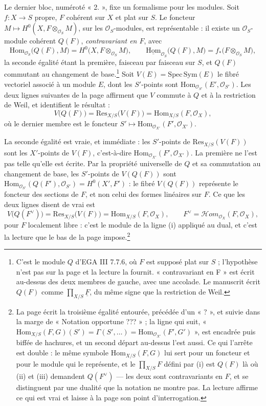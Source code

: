 \documentclass[11pt,a4paper]{article}
\begin{document}
Le dernier bloc, numéroté « 2. », fixe un formalisme pour les modules. Soit
$f : X \to S$ propre, $F$ cohérent sur $X$ et plat sur $S$. Le foncteur $M
\mapsto H^{0}(X, F \otimes_{\mathcal{O}_S} M)$, sur les $\mathcal{O}_S$-modules,
est représentable : il existe un $\mathcal{O}_S$-module cohérent $Q(F)$,
\emph{contravariant en $F$}, avec
\[
  \mathrm{Hom}_{\mathcal{O}_S}\bigl(Q(F), M\bigr) = H^{0}\bigl(X, F \otimes_{\mathcal{O}_S} M\bigr) ,
  \qquad
  \underline{\mathrm{Hom}}_{\mathcal{O}_S}\bigl(Q(F), M\bigr) = f_{*}\bigl(F \otimes_{\mathcal{O}_S} M\bigr) ,
\]
la seconde égalité étant la première, faisceau par faisceau sur $S$, et
$Q(F)$ commutant au changement de base.\footnote{C'est le module $Q$ d'EGA
III 7.7.6, où $F$ est supposé plat sur $S$ ; l'hypothèse n'est pas sur la page
et la lecture la fournit. « contravariant en F » est écrit au-dessus des deux
membres de gauche, avec une accolade. Le manuscrit écrit $Q(F)$ comme
$\prod_{X/S} \underline{F}$, du même signe que la restriction de Weil.} Soit
$V(E) = \mathrm{Spec}\,\mathrm{Sym}(E)$ le fibré vectoriel associé à un
module $E$, dont les $S'$-points sont $\mathrm{Hom}_{\mathcal{O}_{S'}}(E', \mathcal{O}_{S'})$.
Les deux lignes suivantes de la page affirment que $V$ commute à $Q$ et à la
restriction de Weil, et identifient le résultat :
\[
  V\bigl(Q(F)\bigr) = \mathrm{Res}_{X/S}\bigl(V(F)\bigr) = \mathrm{Hom}_{X/S}(F, \mathcal{O}_X) ,
\]
où le dernier membre est le foncteur $S' \mapsto \mathrm{Hom}_{\mathcal{O}_{X'}}(F', \mathcal{O}_{X'})$.

La seconde égalité est vraie, et immédiate : les $S'$-points de
$\mathrm{Res}_{X/S}(V(F))$ sont les $X'$-points de $V(F)$, c'est-à-dire
$\mathrm{Hom}_{\mathcal{O}_{X'}}(F', \mathcal{O}_{X'})$. La première ne l'est pas
telle qu'elle est écrite. Par la propriété universelle de $Q$ et sa
commutation au changement de base, les $S'$-points de $V(Q(F))$ sont
$\mathrm{Hom}_{\mathcal{O}_{S'}}(Q(F'), \mathcal{O}_{S'}) = H^{0}(X', F')$ : le
fibré $V(Q(F))$ représente le foncteur des sections de $F$, et non celui des
formes linéaires sur $F$. Ce que les deux lignes disent de vrai est
\[
  V\bigl(Q(F^{\vee})\bigr) = \mathrm{Res}_{X/S}\bigl(V(F)\bigr) = \mathrm{Hom}_{X/S}(F, \mathcal{O}_X) ,
  \qquad F^{\vee} = \mathcal{H}om_{\mathcal{O}_X}(F, \mathcal{O}_X) ,
\]
pour $F$ localement libre : c'est le module de la ligne (i) appliqué au dual,
et c'est la lecture que le bas de la page impose.\footnote{La page écrit la
troisième égalité entourée, précédée d'un « ? », et suivie dans la marge de
« Notation opportune ??? » ; la ligne qui suit, «
$\mathrm{Hom}_{X/S}(F,G)(S') = \Gamma(S', \ldots) = \mathrm{Hom}_{\mathcal{O}_{X'}}(F', G')$ »,
est encadrée puis biffée de hachures, et un second départ au-dessus l'est
aussi. Ce qui l'arrête est double : le même symbole $\mathrm{Hom}_{X/S}(F, G)$
lui sert pour un foncteur et pour le module qui le représente, et le
$\prod_{X/S} F$ défini par (i) est $Q(F)$ là où (ii) et (iii) demandent
$Q(F^{\vee})$ — les deux sont contravariants en $F$, et se distinguent par
une dualité que la notation ne montre pas. La lecture affirme ce qui est
vrai et laisse à la page son point d'interrogation.}
\end{document}
